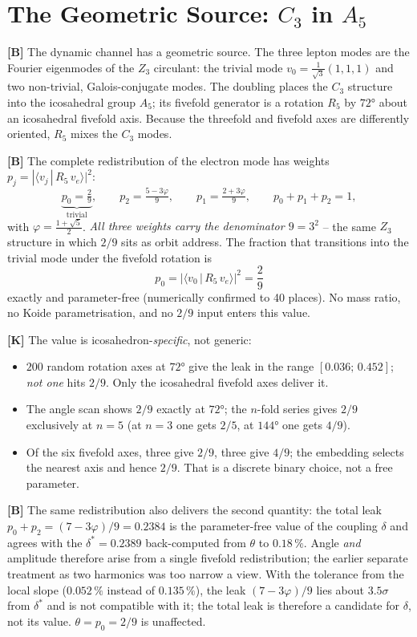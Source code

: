 \section{The Geometric Source: $C_3$ in $A_5$}

\textbf{[B]} The dynamic channel has a geometric source. The three lepton modes
are the Fourier eigenmodes of the $Z_3$ circulant: the trivial mode
$v_0 = \tfrac{1}{\sqrt3}(1,1,1)$ and two non-trivial, Galois-conjugate modes.
The doubling places the $C_3$ structure into the icosahedral group $A_5$; its
fivefold generator is a rotation $R_5$ by $72°$ about an icosahedral fivefold
axis. Because the threefold and fivefold axes are differently oriented, $R_5$
mixes the $C_3$ modes.

\textbf{[B]} The complete redistribution of the electron mode has weights
$p_j = |\langle v_j\,|\,R_5\,v_e\rangle|^2$:
\[
  \underbrace{p_0 = \tfrac29}_{\text{trivial}},\qquad
  p_2 = \tfrac{5-3\varphi}{9},\qquad
  p_1 = \tfrac{2+3\varphi}{9},\qquad
  p_0+p_1+p_2 = 1,
\]
with $\varphi = \tfrac{1+\sqrt5}{2}$. \emph{All three weights carry the denominator
$9 = 3^2$} -- the same $Z_3$ structure in which $2/9$ sits as orbit address. The
fraction that transitions into the trivial mode under the fivefold rotation is
\[
  p_0 = \bigl|\langle v_0\,|\,R_5\,v_e\rangle\bigr|^2 = \frac29
\]
exactly and parameter-free (numerically confirmed to 40 places). No mass ratio,
no Koide parametrisation, and no $2/9$ input enters this value.

\textbf{[K]} The value is icosahedron-\emph{specific}, not generic:
\begin{itemize}
  \item $200$ random rotation axes at $72°$ give the leak in the range
    $[0{.}036;\,0{.}452]$; \emph{not one} hits $2/9$. Only the icosahedral
    fivefold axes deliver it.
  \item The angle scan shows $2/9$ exactly at $72°$; the $n$-fold series gives
    $2/9$ exclusively at $n = 5$ (at $n=3$ one gets $2/5$, at $144°$ one gets
    $4/9$).
  \item Of the six fivefold axes, three give $2/9$, three give $4/9$; the
    embedding selects the nearest axis and hence $2/9$. That is a discrete
    binary choice, not a free parameter.
\end{itemize}

\textbf{[B]} The same redistribution also delivers the second quantity: the total
leak $p_0 + p_2 = (7-3\varphi)/9 = 0{.}2384$ is the parameter-free value of the
coupling $\delta$ and agrees with the $\delta^* = 0{.}2389$ back-computed from
$\theta$ to $0{.}18\,\%$. Angle \emph{and} amplitude therefore arise from a single
fivefold redistribution; the earlier separate treatment as two harmonics was too
narrow a view.
With the tolerance from the local slope ($0{.}052\,\%$ instead of $0{.}135\,\%$), the leak $(7-3\varphi)/9$ lies about $3{.}5\sigma$ from $\delta^*$ and is not compatible with it; the total leak is therefore a candidate for $\delta$, not its value. $\theta=p_0=2/9$ is unaffected.

